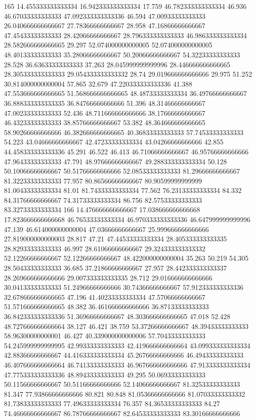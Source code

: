 165 14.455333333333334 16.942333333333334 17.759 46.782333333333334 46.936 46.67033333333333 47.092333333333336 46.594 47.00933333333333 26.040666666666667 27.78366666666667 28.958 47.16866666666667 47.45433333333333 28.42066666666667 28.796333333333333 46.986333333333334 28.582666666666665 29.297 52.074000000000005 52.074000000000005 48.40133333333333 35.28066666666667 50.20066666666667 54.32233333333333 28.528 36.63633333333333 37.263 28.045999999999996 28.446666666666665 28.305333333333333 29.054333333333332 28.74 29.019666666666666 29.975 51.252 30.814000000000004 57.865 32.679 47.220333333333336 41.388 47.553666666666665 51.568666666666665 48.48733333333334 36.49766666666667 36.888333333333335 36.84766666666666 51.396 48.31466666666667 47.00233333333333 52.436 48.711666666666666 38.17666666666667 46.43233333333333 38.85766666666667 53.382 48.364666666666665 58.90266666666666 46.382666666666665 40.36833333333333 57.74533333333333 54.223 43.04666666666667 42.47233333333334 43.04266666666666 42.855 44.458333333333336 45.291 46.522 46.413 46.71066666666667 46.95766666666666 47.96433333333333 47.791 48.97666666666667 49.288333333333334 50.128 50.10066666666667 50.51766666666666 52.08533333333333 81.29666666666667 81.32233333333333 77.957 80.86566666666667 80.90599999999999 81.00433333333334 81.01 81.74333333333334 77.562 76.23133333333334 84.332 84.31766666666667 74.31733333333334 86.756 82.57533333333333 83.32733333333334
166 14.476666666666667 17.038666666666668 17.823666666666668 46.76533333333334 46.970333333333336 46.647999999999996 47.139 46.614000000000004 47.03666666666667 25.999666666666666 27.819000000000003 28.817 47.21 47.44533333333334 28.405333333333335 28.82933333333333 46.997 28.61066666666667 29.324333333333332 52.12266666666667 52.12266666666667 48.422000000000004 35.263 50.219 54.305 28.50433333333333 36.685 37.21866666666667 27.957 28.442333333333337 28.269666666666666 29.007333333333335 28.712 29.016666666666666 30.04133333333333 51.24966666666666 30.74366666666667 57.912333333333336 32.678666666666665 47.196 41.40233333333334 47.57066666666667 51.571666666666665 48.382 36.461666666666666 36.87133333333333 36.842333333333336 51.36966666666667 48.303666666666665 47.018 52.428 48.727666666666664 38.127 46.421 38.759 53.37266666666667 48.39433333333333 58.96300000000001 46.427 40.339000000000006 57.70433333333333 54.245999999999995 42.99333333333333 42.419666666666664 43.099333333333334 42.88366666666667 44.416333333333334 45.26766666666666 46.49433333333333 46.407666666666664 46.74133333333333 46.967666666666666 47.913333333333334 47.775333333333336 48.89433333333333 49.295 50.06933333333333 50.11566666666667 50.51166666666666 52.14066666666667 81.32533333333333 81.347 77.93866666666666 80.821 80.848 81.05366666666666 81.07033333333332 81.73833333333333 77.49633333333334 76.357 84.36533333333333 84.27 74.46666666666667 86.78766666666667 82.64533333333333 83.30166666666666
